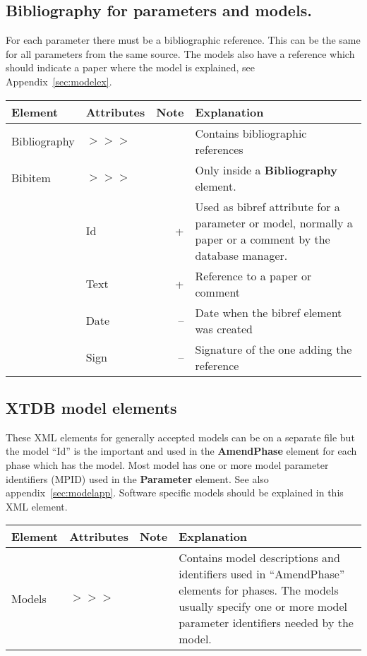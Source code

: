 \documentclass{article}
\begin{document}

\subsection{Bibliography for parameters and models.}\label{sec:biblio}

For each parameter there must be a bibliographic reference.  This can
be the same for all parameters from the same source.  The models also
have a reference which should indicate a paper where the model is
explained, see Appendix~\ref{sec:modelex}.

\bigskip
\begin{tabular}{|p{} p{} r p{}|}\hline
  Element & Attributes & Note & Explanation\\\hline

  Bibliography &$>>>$&& Contains bibliographic references\\\hline

  Bibitem &$>>>$&& Only inside a {\bf Bibliography} element.\\
      & Id & + &   Used as bibref attribute for a parameter or model, normally a paper or a comment by the database manager.\\
      & Text & + & Reference to a paper or comment\\
      & Date & -- & Date when the bibref element was created\\
      & Sign & -- & Signature of the one adding the reference\\\hline

\end{tabular}


\subsection{XTDB model elements}\label{sec:models}

These XML elements for generally accepted models can be on a separate
file but the model ``Id'' is the important and used in the {\bf
  AmendPhase} element for each phase which has the model.  Most model
has one or more model parameter identifiers (MPID) used in the {\bf
  Parameter} element.  See also appendix~\ref{sec:modelapp}.  Software
specific models should be explained in this XML element.

\bigskip
\begin{tabular}{|p{} p{} r p{}|}\hline
  Element & Attributes & Note & Explanation\\\hline

  Models   &$>>>$&& Contains model descriptions and identifiers used in ``AmendPhase'' elements for phases.  The models usually specify one or more model parameter identifiers needed by the model.\\\hline
\end{tabular}
\end{document}
